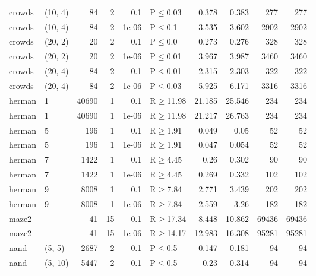 \begin{longtable}{llrrrlrrrr}
 crowds        & (10, 4)   &     	84 &   2 & 0.1   & P$\leq$0.03  & 0.378   & 0.383   & 277   & 277   \\
 crowds        & (10, 4)   &     	84 &   2 & 1e-06 & P$\leq$0.1   & 3.535   & 3.602   & 2902  & 2902  \\
 crowds        & (20, 2)   &     	20 &   2 & 0.1   & P$\leq$0.0   & 0.273   & 0.276   & 328   & 328   \\
 crowds        & (20, 2)   &     	20 &   2 & 1e-06 & P$\leq$0.01  & 3.967   & 3.987   & 3460  & 3460  \\
 crowds        & (20, 4)   &     	84 &   2 & 0.1   & P$\leq$0.01  & 2.315   & 2.303   & 322   & 322   \\
 crowds        & (20, 4)   &     	84 &   2 & 1e-06 & P$\leq$0.03  & 5.925   & 6.171   & 3316  & 3316  \\
 herman        & 1         &  	40690 &   1 & 0.1   & R$\geq$11.98 & 21.185  & 25.546  & 234   & 234   \\
 herman        & 1         &  	40690 &   1 & 1e-06 & R$\geq$11.98 & 21.217  & 26.763  & 234   & 234   \\
 herman        & 5         &    	196 &   1 & 0.1   & R$\geq$1.91  & 0.049   & 0.05    & 52    & 52    \\
 herman        & 5         &    	196 &   1 & 1e-06 & R$\geq$1.91  & 0.047   & 0.054   & 52    & 52    \\
 herman        & 7         &   	1422 &   1 & 0.1   & R$\geq$4.45  & 0.26    & 0.302   & 90    & 90    \\
 herman        & 7         &   	1422 &   1 & 1e-06 & R$\geq$4.45  & 0.269   & 0.332   & 102   & 102   \\
 herman        & 9         &   	8008 &   1 & 0.1   & R$\geq$7.84  & 2.771   & 3.439   & 202   & 202   \\
 herman        & 9         &   	8008 &   1 & 1e-06 & R$\geq$7.84  & 2.559   & 3.26    & 182   & 182   \\
 maze2         &           &     	41 &  15 & 0.1   & R$\geq$17.34 & 8.448   & 10.862  & 69436 & 69436 \\
 maze2         &           &     	41 &  15 & 1e-06 & R$\geq$14.17 & 12.983  & 16.308  & 95281 & 95281 \\
 nand          & (5, 5)    &   	2687 &   2 & 0.1   & P$\leq$0.5   & 0.147   & 0.181   & 94    & 94    \\
 nand          & (5, 10)   &   	5447 &   2 & 0.1   & P$\leq$0.5   & 0.23    & 0.314   & 94    & 94    \\

\end{longtable}
